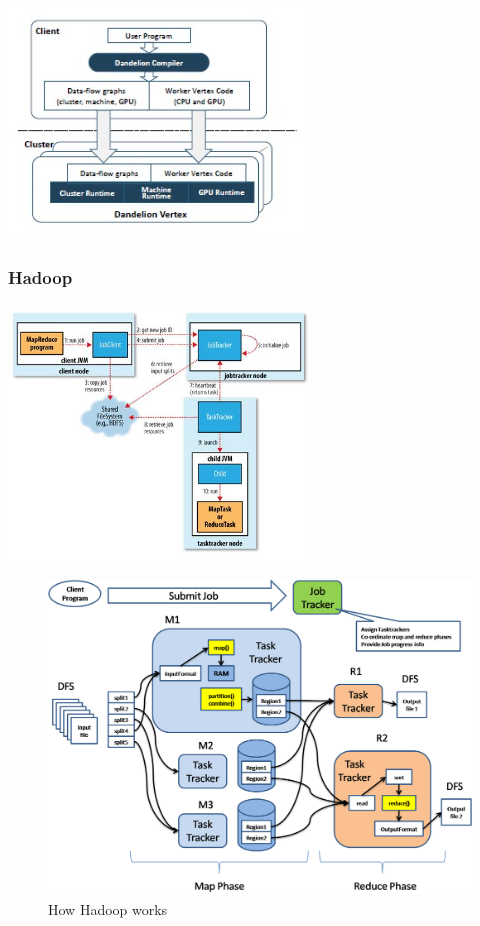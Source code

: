 \documentclass{myproc}
\begin{document}
\centerline{\includegraphics[width=8cm]{pics/dandalion}}

\subsubsection{Hadoop}

\centerline{\includegraphics[width=8cm]{pics/mapred}}

\begin{figure}[hbt]
\centerline{\includegraphics[width=12cm]{pics/hadoop}}
\caption{How Hadoop works}
\end{figure}
\end{document}
